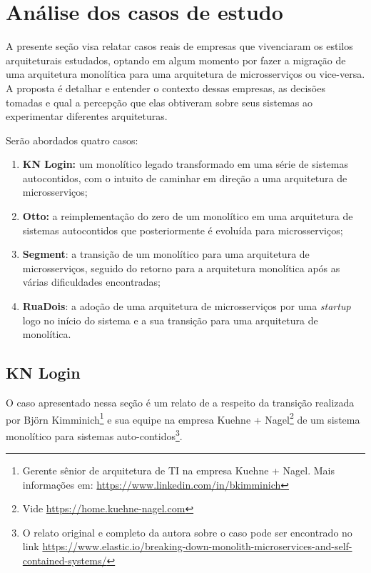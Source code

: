 \chapter{Análise dos casos de estudo}

A presente seção visa relatar casos reais de empresas que vivenciaram os estilos arquiteturais
estudados, optando em algum momento por fazer a migração de uma arquitetura monolítica para uma
arquitetura de microsserviços ou vice-versa. A proposta é detalhar e entender o contexto dessas empresas,
as decisões tomadas e qual a percepção que elas obtiveram sobre seus sistemas ao experimentar diferentes
arquiteturas.

Serão abordados quatro casos:

\begin{enumerate}
    \item \textbf{KN Login:} um monolítico legado transformado em uma série de sistemas
        autocontidos, com o intuito de caminhar em direção a uma arquitetura de microsserviços;
    \item \textbf{Otto:} a reimplementação do zero de um monolítico em uma arquitetura de sistemas
        autocontidos que posteriormente é evoluída para microsserviços;
    \item \textbf{Segment}: a transição de um monolítico para uma arquitetura de microsserviços,
        seguido do retorno para a arquitetura monolítica após as várias dificuldades encontradas;
    \item \textbf{RuaDois}: a adoção de uma arquitetura de microsserviços por uma \textit{startup}
        logo no início do sistema e a sua transição para uma arquitetura de monolítica.
\end{enumerate}

\section{KN Login}
\label{sec:KNLogin}

O caso apresentado nessa seção é um relato de  a respeito
da transição realizada por Björn Kimminich\footnote{Gerente sênior de arquitetura de TI na empresa
Kuehne + Nagel. Mais informações em: \url{https://www.linkedin.com/in/bkimminich}} e sua equipe na empresa
Kuehne + Nagel\footnote{Vide \url{https://home.kuehne-nagel.com}} de um sistema monolítico para sistemas
auto-contidos\footnote{O relato original e completo da autora sobre o caso pode ser encontrado no link
\url{https://www.elastic.io/breaking-down-monolith-microservices-and-self-contained-systems/}}. 

